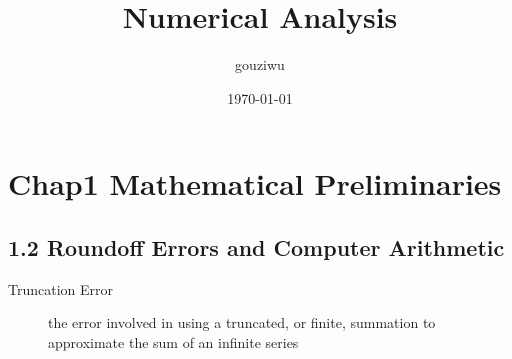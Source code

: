 \documentclass[11pt]{article}
\author{gouziwu}
\date{\today}
\title{Numerical Analysis}
\begin{document}
\maketitle
\tableofcontents



\section{Chap1 Mathematical Preliminaries}
\label{sec:orgbdb7ab4}
\subsection{1.2 Roundoff Errors and Computer Arithmetic}
\label{sec:org8888d58}
\begin{description}
\item[{Truncation Error}] the error involved in using a truncated, or finite, summation to
approximate the sum of an infinite series
\end{description}
\end{document}
